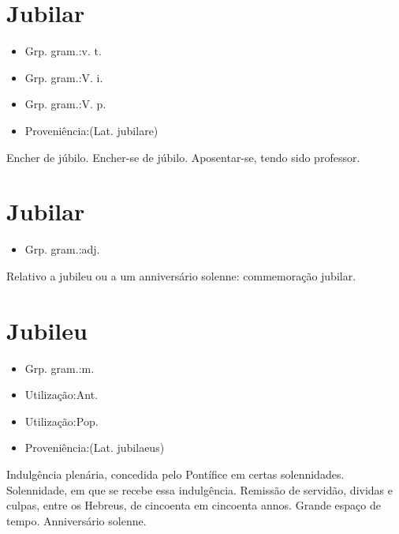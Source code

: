 \documentclass{article}
\begin{document}
\section{Jubilar}
\begin{itemize}
\item {Grp. gram.:v. t.}
\end{itemize}
\begin{itemize}
\item {Grp. gram.:V. i.}
\end{itemize}
\begin{itemize}
\item {Grp. gram.:V. p.}
\end{itemize}
\begin{itemize}
\item {Proveniência:(Lat. \textunderscore jubilare\textunderscore )}
\end{itemize}
Encher de júbilo.
Encher-se de júbilo.
Aposentar-se, tendo sido professor.
\section{Jubilar}
\begin{itemize}
\item {Grp. gram.:adj.}
\end{itemize}
Relativo a jubileu ou a um anniversário solenne: \textunderscore commemoração jubilar\textunderscore .
\section{Jubileu}
\begin{itemize}
\item {Grp. gram.:m.}
\end{itemize}
\begin{itemize}
\item {Utilização:Ant.}
\end{itemize}
\begin{itemize}
\item {Utilização:Pop.}
\end{itemize}
\begin{itemize}
\item {Proveniência:(Lat. \textunderscore jubilaeus\textunderscore )}
\end{itemize}
Indulgência plenária, concedida pelo Pontífice em certas solennidades.
Solennidade, em que se recebe essa indulgência.
Remissão de servidão, dividas e culpas, entre os Hebreus, de cincoenta em cincoenta annos.
Grande espaço de tempo.
Anniversário solenne.
\end{document}
